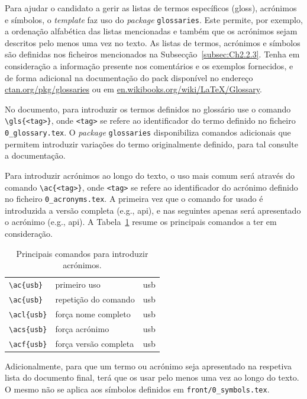 Para ajudar o candidato a gerir as listas de termos específicos (\gls{gloss}), acrónimos e símbolos, o \textit{template} faz uso do \textit{package} \verb|glossaries|. Este permite, por exemplo, a ordenação alfabética das listas mencionadas e também que os acrónimos sejam descritos pelo menos uma vez no texto. As listas de termos, acrónimos e símbolos são definidas nos ficheiros mencionados na Subsecção~\ref{subsec:Ch2.2.3}. Tenha em consideração a informação presente nos comentários e os exemplos fornecidos, e de forma adicional na documentação do \gls{pack} disponível no endereço \url{ctan.org/pkg/glossaries} ou em \url{en.wikibooks.org/wiki/LaTeX/Glossary}.

No documento, para introduzir os termos definidos no glossário use o comando \verb|\gls{<tag>}|, onde \verb|<tag>| se refere ao identificador do termo definido no ficheiro \verb|0_glossary.tex|. O \textit{package} \verb|glossaries| disponibiliza comandos adicionais que permitem introduzir variações do termo originalmente definido, para tal consulte a documentação.

Para introduzir acrónimos ao longo do texto, o uso mais comum será através do comando \verb|\ac{<tag>}|, onde \verb|<tag>| se refere ao identificador do acrónimo definido no ficheiro \verb|0_acronyms.tex|. A primeira vez que o comando for usado é introduzida a versão completa (e.g., \ac{api}), e nas seguintes apenas será apresentado o acrónimo (e.g., \ac{api}). A Tabela~\ref{tab:acros} resume os principais comandos a ter em consideração. 

\begin{table}[htb]
	\caption{Principais comandos para introduzir acrónimos.}
	\label{tab:acros}
	\centering
	\begin{tabular}{l l l}
	\toprule
	\tabhead{Comando} & \tabhead{} & \tabhead{Resultado} \\
	\midrule
		\verb|\ac{usb}| & primeiro uso & \ac{usb}\\
		\verb|\ac{usb}| & repetição do comando & \ac{usb}\\
		\verb|\acl{usb}| & força nome completo & \acl{usb}\\
		\verb|\acs{usb}| & força acrónimo & \acs{usb}\\
		\verb|\acf{usb}| & força versão completa & \acf{usb}\\
	\bottomrule
	\end{tabular}
\end{table}

Adicionalmente, para que um termo ou acrónimo seja apresentado na respetiva lista do documento final, terá que os usar pelo menos uma vez ao longo do texto. O mesmo não se aplica aos símbolos definidos em \verb|front/0_symbols.tex|.

